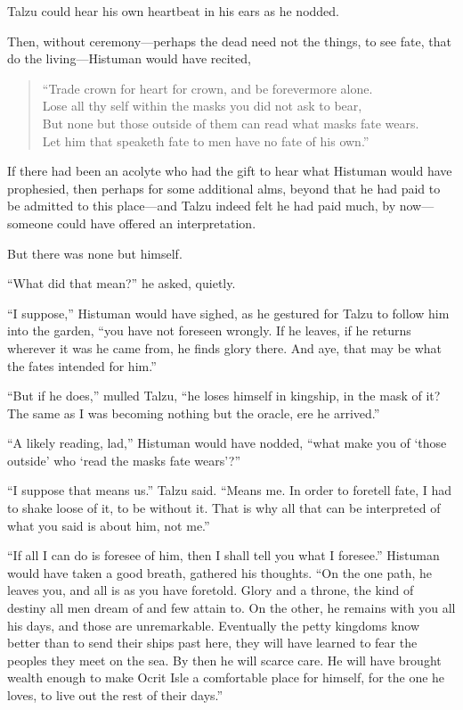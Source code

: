 Talzu could hear his own heartbeat in his ears as he nodded.

Then, without ceremony---perhaps the dead need not the things, to see fate, that do the living---Histuman would have recited,

\begin{verse}
``Trade crown for heart for crown, and be forevermore alone. \\
Lose all thy self within the masks you did not ask to bear, \\
But none but those outside of them can read what masks fate wears. \\
Let him that speaketh fate to men have no fate of his own.''
\end{verse}

If there had been an acolyte who had the gift to hear what Histuman would have prophesied, then perhaps for some additional alms, beyond that he had paid to be admitted to this place---and Talzu indeed felt he had paid much, by now---someone could have offered an interpretation.

But there was none but himself.

``What did that mean?'' he asked, quietly.

``I suppose,'' Histuman would have sighed, as he gestured for Talzu to follow him into the garden, ``you have not foreseen wrongly. If he leaves, if he returns wherever it was he came from, he finds glory there. And aye, that may be what the fates intended for him.''

``But if he does,'' mulled Talzu, ``he loses himself in kingship, in the mask of it? The same as I was becoming nothing but the oracle, ere he arrived.''

``A likely reading, lad,'' Histuman would have nodded, ``what make you of `those outside' who `read the masks fate wears'?''

``I suppose that means us.'' Talzu said. ``Means me. In order to foretell fate, I had to shake loose of it, to be without it. That is why all that can be interpreted of what you said is about him, not me.''

``If all I can do is foresee of him, then I shall tell you what I foresee.'' Histuman would have taken a good breath, gathered his thoughts. ``On the one path, he leaves you, and all is as you have foretold. Glory and a throne, the kind of destiny all men dream of and few attain to. On the other, he remains with you all his days, and those are unremarkable. Eventually the petty kingdoms know better than to send their ships past here, they will have learned to fear the peoples they meet on the sea. By then he will scarce care. He will have brought wealth enough to make Ocrit Isle a comfortable place for himself, for the one he loves, to live out the rest of their days.''

